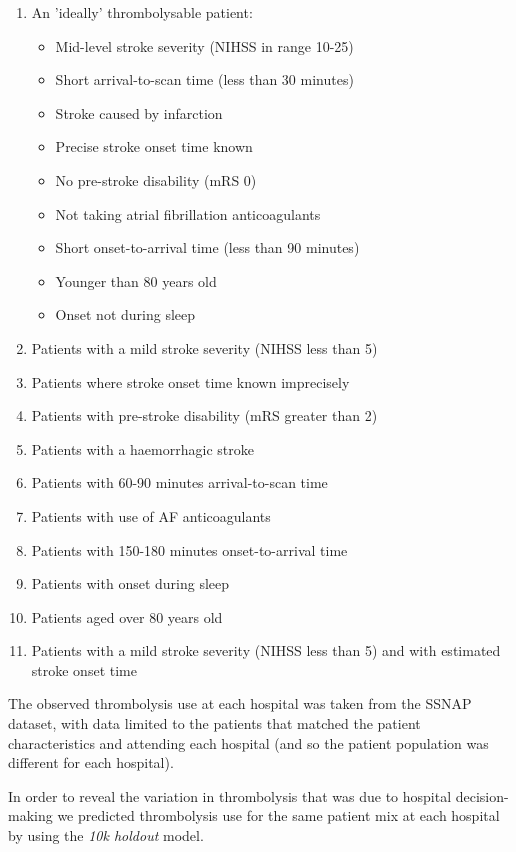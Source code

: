 \begin{enumerate}
  \item An 'ideally' thrombolysable patient:
  \begin{itemize}
    \item Mid-level stroke severity (NIHSS in range 10-25)
    \item Short arrival-to-scan time (less than 30 minutes)
    \item Stroke caused by infarction
    \item Precise stroke onset time known
    \item No pre-stroke disability (mRS 0)
    \item Not taking atrial fibrillation anticoagulants
    \item Short onset-to-arrival time (less than 90 minutes)
    \item Younger than 80 years old
    \item Onset not during sleep
  \end{itemize}
  \item Patients with a mild stroke severity (NIHSS less than 5)
  \item Patients where stroke onset time known imprecisely
  \item Patients with pre-stroke disability (mRS greater than 2)
  \item Patients with a haemorrhagic stroke
  \item Patients with 60-90 minutes arrival-to-scan time
  \item Patients with use of AF anticoagulants
  \item Patients with 150-180 minutes onset-to-arrival time
  \item Patients with onset during sleep
  \item Patients aged over 80 years old
  \item Patients with a mild stroke severity (NIHSS less than 5) and with estimated stroke onset time
\end{enumerate}

The observed thrombolysis use at each hospital was taken from the SSNAP dataset, with data limited to the patients that matched the patient characteristics and attending each hospital (and so the patient population was different for each hospital).

In order to reveal the variation in thrombolysis that was due to hospital decision-making we predicted thrombolysis use for the same patient mix at each hospital by using the \emph{10k holdout} model.




